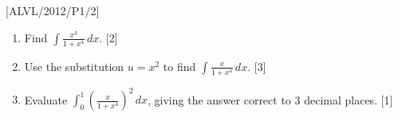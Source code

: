 \item {[}ALVL/2012/P1/2{]}
\begin{enumerate}
\item Find $\int\frac{x^{3}}{1+x^{4}}\,dx$. \hfill{}{[}2{]}
\item Use the substitution $u=x^{2}$ to find $\int\frac{x}{1+x^{4}}\,dx$.
\hfill{} {[}3{]}
\item Evaluate $\int_{0}^{1}\left(\frac{x}{1+x^{4}}\right)^{2}\,dx$, giving
the answer correct to 3 decimal places. \hfill{}{[}1{]}
\end{enumerate}
